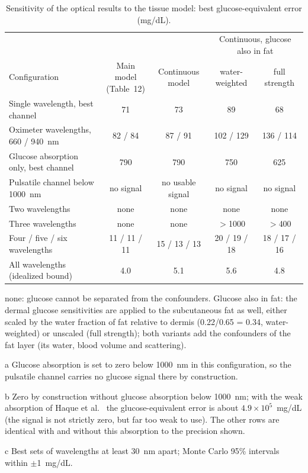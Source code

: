 \documentclass[10pt]{article}
\newcommand{\mgdl}{mg/dL}
\begin{document}
\begin{table}[H]
\centering\small
\begin{threeparttable}
\caption{Sensitivity of the optical results to the tissue model: best glucose-equivalent error (\mgdl{}).}
\label{tab:tissue}
\setlength{\tabcolsep}{4pt}
\begin{tabular}{@{}lcccc@{}}
\toprule
& & & \multicolumn{2}{c}{Continuous, glucose also in fat} \\
\cmidrule(l){4-5}
Configuration & \makecell{Main model\\(Table~12)} & \makecell{Continuous\\model} & \makecell{water-\\weighted} & \makecell{full\\strength} \\
\midrule
Single wavelength, best channel & 71 & 73 & 89 & 68 \\
Oximeter wavelengths, 660 / 940~nm & 82 / 84 & 87 / 91 & 102 / 129 & 136 / 114 \\
Glucose absorption only, best channel & 790 & 790 & 750 & 625 \\
Pulsatile channel below 1000~nm & no signal\tnote{a} & no usable signal\tnote{b} & no signal\tnote{a} & no signal\tnote{a} \\
Two wavelengths & none & none & none & none \\
Three wavelengths & none & none & $>$1000 & $>$400 \\
Four / five / six wavelengths\tnote{c} & 11 / 11 / 11 & 15 / 13 / 13 & 20 / 19 / 18 & 18 / 17 / 16 \\
All wavelengths (idealized bound) & 4.0 & 5.1 & 5.6 & 4.8 \\
\bottomrule
\end{tabular}
\begin{tablenotes}\footnotesize
\item none: glucose cannot be separated from the confounders. Glucose also in fat: the dermal glucose sensitivities are applied to the subcutaneous fat as well, either scaled by the water fraction of fat relative to dermis (0.22/0.65 = 0.34, water-weighted) or unscaled (full strength); both variants add the confounders of the fat layer (its water, blood volume and scattering). \item[a] Glucose absorption is set to zero below 1000~nm in this configuration, so the pulsatile channel carries no glucose signal there by construction. \item[b] Zero by construction without glucose absorption below 1000~nm; with the weak absorption of Haque et al.~\cite{haque2021} the glucose-equivalent error is about $4.9\times10^5$~\mgdl{} (the signal is not strictly zero, but far too weak to use). The other rows are identical with and without this absorption to the precision shown. \item[c] Best sets of wavelengths at least 30~nm apart; Monte Carlo 95\% intervals within $\pm$1~\mgdl{}.
\end{tablenotes}
\end{threeparttable}
\end{table}
\end{document}
